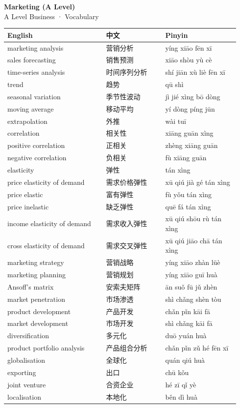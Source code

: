 \documentclass[11pt]{article}
\begin{document}
\begin{center}
  {\LARGE\bfseries Marketing (A Level)}\\[0.35em]
  {\large A Level Business · Vocabulary}
\end{center}
\vspace{0.6em}

\begin{longtable}{@{}p{0.40\linewidth}p{0.24\linewidth}p{0.30\linewidth}@{}}
\toprule
\textbf{English} & \textbf{中文} & \textbf{Pinyin} \\
\midrule
\endhead
\bottomrule
\endlastfoot
marketing analysis & 营销分析 & yíng xiāo fēn xī \\
sales forecasting & 销售预测 & xiāo shòu yù cè \\
time-series analysis & 时间序列分析 & shí jiān xù liè fēn xī \\
trend & 趋势 & qū shì \\
seasonal variation & 季节性波动 & jì jié xìng bō dòng \\
moving average & 移动平均 & yí dòng píng jūn \\
extrapolation & 外推 & wài tuī \\
correlation & 相关性 & xiāng guān xìng \\
positive correlation & 正相关 & zhèng xiāng guān \\
negative correlation & 负相关 & fù xiāng guān \\
elasticity & 弹性 & tán xìng \\
price elasticity of demand & 需求价格弹性 & xū qiú jià gé tán xìng \\
price elastic & 富有弹性 & fù yǒu tán xìng \\
price inelastic & 缺乏弹性 & quē fá tán xìng \\
income elasticity of demand & 需求收入弹性 & xū qiú shōu rù tán xìng \\
cross elasticity of demand & 需求交叉弹性 & xū qiú jiāo chā tán xìng \\
marketing strategy & 营销战略 & yíng xiāo zhàn lüè \\
marketing planning & 营销规划 & yíng xiāo guī huà \\
Ansoff's matrix & 安索夫矩阵 & ān suǒ fū jǔ zhèn \\
market penetration & 市场渗透 & shì chǎng shèn tòu \\
product development & 产品开发 & chǎn pǐn kāi fā \\
market development & 市场开发 & shì chǎng kāi fā \\
diversification & 多元化 & duō yuán huà \\
product portfolio analysis & 产品组合分析 & chǎn pǐn zǔ hé fēn xī \\
globalisation & 全球化 & quán qiú huà \\
exporting & 出口 & chū kǒu \\
joint venture & 合资企业 & hé zī qǐ yè \\
localisation & 本地化 & běn dì huà \\
\end{longtable}
\end{document}
